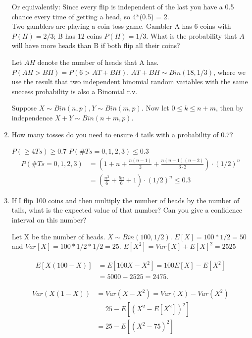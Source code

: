 \documentclass{article}
\begin{document}
\begin{enumerate}
    Or equivalently: Since every flip is independent of the last you have a 0.5 chance every time of getting a head, so 4*(0.5) = 2. \\
    Two gamblers are playing a coin toss game. Gambler A has 6 coins with $P(H)=2/3$; B has 12 coins $P(H)=1/3$. What is the probability that $A$ will have more heads than B if both flip all their coins?


Let $AH$ denote the number of heads that A has. $P(AH>BH)=P(6>AT+BH)$. 
$AT+BH\sim Bin(18,1/3)$, where we use the result that two independent binomial random variables with the same success probability is also a Binomial r.v.

Suppose $X \sim Bin(n, p), Y \sim Bin(m, p)$. Now let $0 \leq k \leq n+m$, then by independence $X+Y \sim Bin(n+m, p)$.

    \item How many tosses do you need to ensure 4 tails with a probability of 0.7?

    $P(\geq 4 Ts)\geq0.7$
    $P(\#Ts=0, 1,2,3) \leq 0.3 $
    \begin{align*}
        P(\#Ts=0, 1,2,3) &= \left(1+n+\frac{n(n-1)}{2}+\frac{n(n-1)(n-2)}{3\cdot 2}\right)\cdot(1/2)^n \\
        &=\left(\frac{n^3}{6} +\frac{5n}{6}+1\right)\cdot (1/2)^n \leq 0.3
    \end{align*}

         \item If I flip 100 coins and then multiply the number of heads by the number of tails, what is the expected value of that number? Can you give a confidence interval on this number?

     Let X be the number of heads. $X\sim Bin(100, 1/2)$. $E[X]=100*1/2=50 $ and $Var[X] = 100*1/2*1/2 = 25$. $E[X^2] = Var[X]+E[X]^2 = 2525$

     \begin{align*}
         E[X(100-X)] &= E[100X-X^2] = 100E[X]-E[X^2] \\
         &= 5000-2525 = 2475.
     \end{align*}

     \begin{align*}
         Var(X(1-X)) &= Var(X-X^2) = Var(X)-Var(X^2) \\ 
         &= 25- E[(X^2-E[X^2])^2] \\
         &= 25 - E[(X^2-75)^2] \\ 
     \end{align*}


\end{enumerate}
\end{document}
